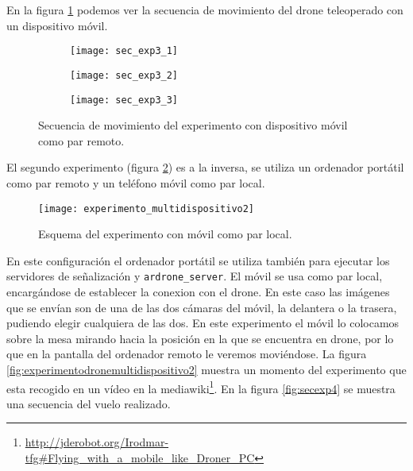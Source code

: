 En la figura \ref{fig:secexp3} podemos ver la secuencia de movimiento del drone teleoperado con un dispositivo móvil.\\

\begin{figure}[h!]
\centering
  \begin{subfigure}[]{48mm}
    \texttt{[image: sec\_exp3\_1]}
  \end{subfigure}
  \hspace{1pt}
  \begin{subfigure}[]{48mm}
    \texttt{[image: sec\_exp3\_2]}
  \end{subfigure}
    \hspace{1pt}
    \begin{subfigure}[]{48mm}
    \texttt{[image: sec\_exp3\_3]}
  \end{subfigure}
    \caption{Secuencia de movimiento del experimento con dispositivo móvil como par remoto.}
  \label{fig:secexp3}
\end{figure}


\newpage
El segundo experimento (figura \ref{fig:esquemaexperimentomultidispositivo2}) es a la inversa, se utiliza un ordenador portátil como par remoto y un teléfono móvil como par local.

\begin{figure}[h!]
\centering
\texttt{[image: experimento\_multidispositivo2]}
\caption{Esquema del experimento con móvil como par local.}
\label{fig:esquemaexperimentomultidispositivo2}
\end{figure}

En este configuración el ordenador portátil se utiliza también para ejecutar los servidores de señalización y \texttt{ardrone\_server}. El móvil se usa como par local, encargándose de establecer la conexion con el drone. En este caso las imágenes que se envían son de una de las dos cámaras del móvil, la delantera o la trasera, pudiendo elegir cualquiera de las dos. En este experimento el móvil lo colocamos sobre la mesa mirando hacia la posición en la que se encuentra en drone, por lo que en la pantalla del ordenador remoto le veremos moviéndose. La figura \ref{fig:experimentodronemultidispositivo2} muestra un momento del experimento que esta recogido en un vídeo en la mediawiki\footnote{\url{http://jderobot.org/Irodmar-tfg#Flying_with_a_mobile_like_Droner_PC}}. En la figura \ref{fig:secexp4} se muestra una secuencia del vuelo realizado.\\

